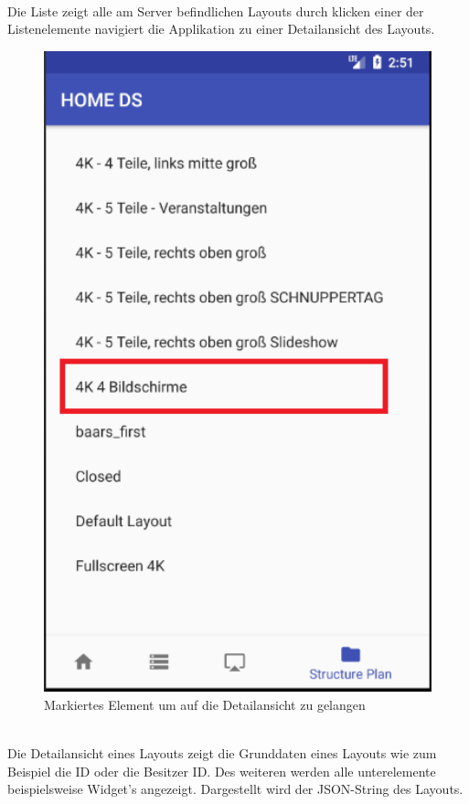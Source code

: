 \\
Die Liste zeigt alle am Server befindlichen Layouts durch klicken einer der Listenelemente navigiert die Applikation zu einer Detailansicht des Layouts.
\\
\begin{figure}[H]
\centering
\includegraphics[width=1.0\textwidth]{images/06_AndroidApp/06_StructureNavigationToDetail}
\caption{Markiertes Element um auf die Detailansicht zu gelangen}
\label{fig:mediaNav}
\end{figure}
\\
Die Detailansicht eines Layouts zeigt die Grunddaten eines Layouts wie zum Beispiel die ID oder die Besitzer ID. Des weiteren werden alle unterelemente beispielsweise Widget's angezeigt. Dargestellt wird der JSON-String des Layouts.
